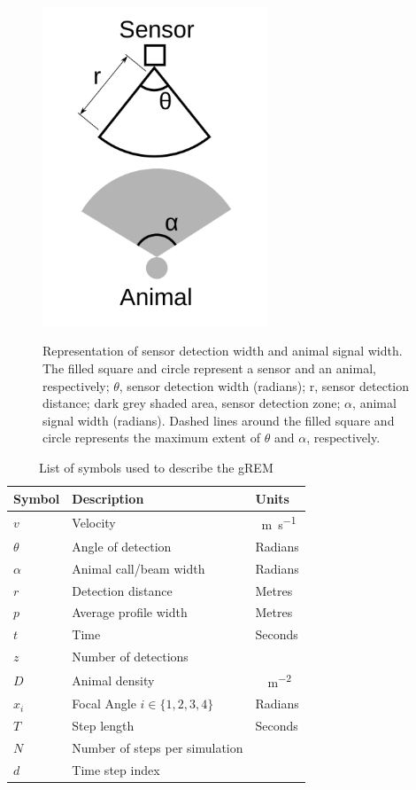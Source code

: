 \documentclass[a4paper,10pt,reqno,oneside]{amsart}
\begin{document}
\begin{figure}[t]
        \centering
	\includegraphics[width=0.6\textwidth]{imgs/angleDefinitions.pdf}
\label{f:AngleDef}
\caption{Representation of sensor detection width and animal signal width. The filled square and circle represent a sensor and an animal, respectively; $\theta$, sensor detection width (radians); r, sensor detection distance; dark grey shaded area, sensor detection zone; $\alpha$, animal signal width (radians). Dashed lines around the filled square and circle represents the maximum extent of $\theta$ and $\alpha$, respectively.} %

\end{figure}



\begin{table}[t]
\centering
\begin{tabular}{lll}
Symbol 	& Description & Units\\\hline
$v$		& Velocity & \SI{}{\meter\per\second}\\
$\theta$	& Angle of detection & Radians \\
$\alpha$	& Animal call/beam width & Radians \\
$r$ 		& Detection distance & Metres\\
$p$ 		& Average profile width & Metres\\
$t$		& Time & Seconds\\
$z$		& Number of detections & \\
$D$		& Animal density & \SI{}{\animals\per\meter\squared} \\
$x_i$	        & Focal Angle $i \in \{1,2,3,4\} $ 	& Radians\\
$T$ 		& Step length & Seconds\\
$N$ 		& Number of steps per simulation & \\
$d$ 		& Time step index &

\end{tabular}
\caption{List of symbols used to describe the gREM}
\label{t:paras}
\end{table}
\end{document}
